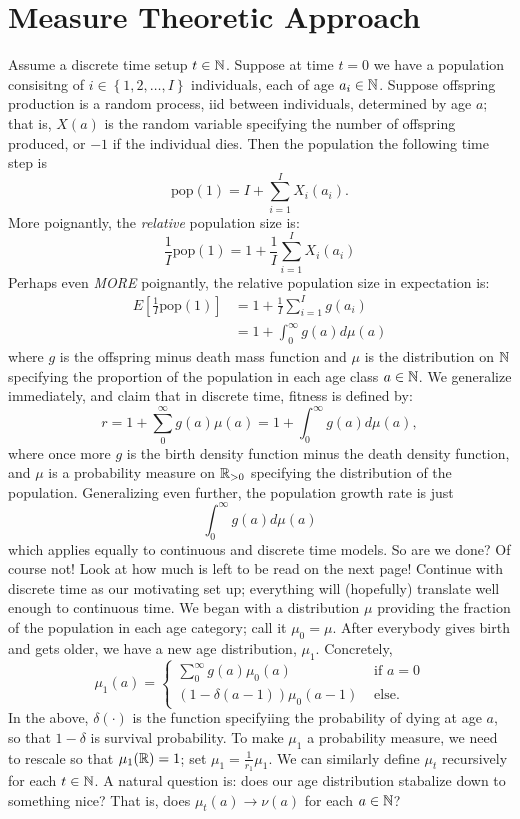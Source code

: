 \section{Measure Theoretic Approach}

Assume a discrete time setup $t\in\mathbb{N}$.
Suppose at time $t = 0$ we have a population consisitng of $i\in\left\{ 1, 2, \ldots, I \right\}$ individuals,
each of age $a_i\in\mathbb{N}$. Suppose offspring production is a random process,
iid between individuals, determined by age $a$; that is, $X(a)$ is the random variable specifying the number of offspring produced, or $-1$ if 
the individual dies. Then the population the following time step is 
$$ \text{pop}(1) = I + \sum\limits_{i = 1}^I X_i(a_i).$$
More poignantly, the \textit{relative} population size is:
$$\frac{1}{I}\text{pop}(1) = 1 + \frac{1}{I}\sum\limits_{i = 1}^I X_i(a_i)$$
Perhaps even \textit{MORE} poignantly, the relative population size in expectation is:
\begin{align*}
    E\left[\frac{1}{I}\text{pop}(1)\right] &= 1 + \frac{1}{I}\sum\limits_{i = 1}^I g(a_i) \\
    &= 1 + \int_0^\infty g(a) d\mu(a)
\end{align*}
where $g$ is the offspring minus death mass function and $\mu$ is the distribution on
$\mathbb{N}$ specifying the proportion of the population in each age class $a\in\mathbb{N}$. We generalize immediately,
and claim that in discrete time, fitness is defined by:
$$ r = 1 + \sum\limits_0^\infty g(a) \mu(a) = 1 + \int_0^\infty g(a) d\mu(a), $$
where once more $g$ is the birth density function minus the death density function, and $\mu$ is a probability
measure on $\mathbb{R}_{> 0}$ specifying the distribution of the population. Generalizing even further, the population growth rate
is just
$$ \int_0^\infty g(a) d\mu(a) $$
which applies equally to continuous and discrete time models. So are we done? Of course not! Look at how much is left to be read on
the next page! Continue with discrete time as our motivating set up; everything will (hopefully) translate well enough to continuous
time. We began with a distribution $\mu$ providing the fraction of the population in each age category; call it $\mu_0 = \mu$. After
everybody gives birth and gets older, we have a new age distribution, $\mu_1$. Concretely,
$$ \mu_1(a) = 
\begin{cases}
    \sum\limits_0^\infty g(a) \mu_0(a) & \text{ if  } a = 0 \\
    (1 - \delta(a-1))\mu_0(a-1) & \text{ else.}
\end{cases}
$$
In the above, $\delta(\cdot)$ is the function specifyiing the probability of dying at age $a$, so that $1-\delta$ is survival probability.
To make $\mu_1$ a probability measure, we need to rescale so that $\mu_1(\mathbb{R}) = 1$; set $\mu_1 = \frac{1}{r_1}\mu_1$. We can similarly define
$\mu_t$ recursively for each $t\in\mathbb{N}$. A natural question is: does our age distribution stabalize down to something nice? That is, does
$\mu_t(a)\to \nu(a)$ for each $a\in\mathbb{N}$? 

